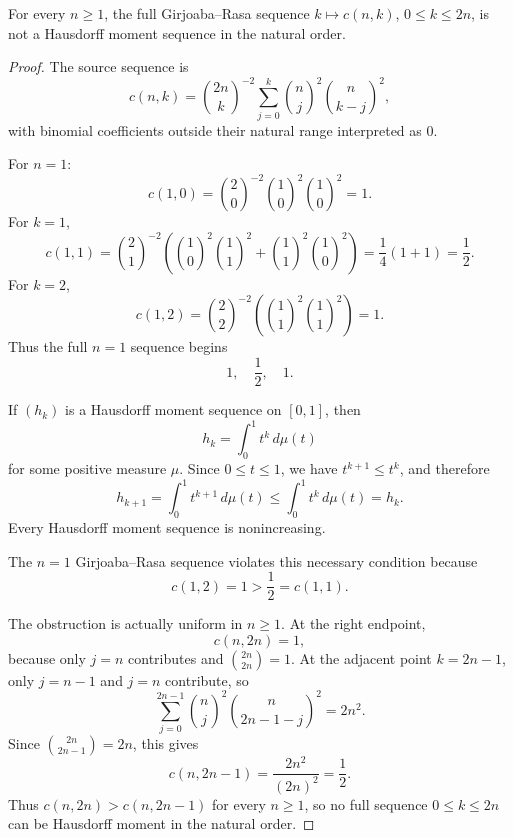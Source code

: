 \begin{proposition}
\label{res:gr-cnk-full-sequence-not-hausdorff-any-n}
For every \(n\ge1\), the full Girjoaba--Rasa sequence \(k\mapsto c(n,k)\), \(0\le k\le2n\), is not a Hausdorff moment sequence in the natural order.
\end{proposition}
\begin{proof}
The source sequence is
\[
c(n,k)=\binom{2n}{k}^{-2}
\sum_{j=0}^k \binom{n}{j}^2\binom{n}{k-j}^2,
\]
with binomial coefficients outside their natural range interpreted as \(0\).

For \(n=1\):
\[
c(1,0)=\binom20^{-2}\binom10^2\binom10^2=1.
\]
For \(k=1\),
\[
c(1,1)=\binom21^{-2}
\left(\binom10^2\binom11^2+\binom11^2\binom10^2\right)
=\frac14(1+1)=\frac12.
\]
For \(k=2\),
\[
c(1,2)=\binom22^{-2}
\left(\binom11^2\binom11^2\right)=1.
\]
Thus the full \(n=1\) sequence begins
\[
1,\quad \frac12,\quad 1.
\]

If \((h_k)\) is a Hausdorff moment sequence on \([0,1]\), then
\[
h_k=\int_0^1 t^k\,d\mu(t)
\]
for some positive measure \(\mu\).  Since \(0\le t\le1\), we have \(t^{k+1}\le t^k\), and therefore
\[
h_{k+1}=\int_0^1 t^{k+1}\,d\mu(t)
\le
\int_0^1 t^k\,d\mu(t)=h_k.
\]
Every Hausdorff moment sequence is nonincreasing.

The \(n=1\) Girjoaba--Rasa sequence violates this necessary condition because
\[
c(1,2)=1>\frac12=c(1,1).
\]

The obstruction is actually uniform in \(n\ge1\).  At the right endpoint,
\[
c(n,2n)=1,
\]
because only \(j=n\) contributes and \(\binom{2n}{2n}=1\).  At the adjacent point \(k=2n-1\), only \(j=n-1\) and \(j=n\) contribute, so
\[
\sum_{j=0}^{2n-1}\binom{n}{j}^2\binom{n}{2n-1-j}^2
=2n^2.
\]
Since \(\binom{2n}{2n-1}=2n\), this gives
\[
c(n,2n-1)=\frac{2n^2}{(2n)^2}=\frac12.
\]
Thus \(c(n,2n)>c(n,2n-1)\) for every \(n\ge1\), so no full sequence \(0\le k\le2n\) can be Hausdorff moment in the natural order.
\end{proof}

